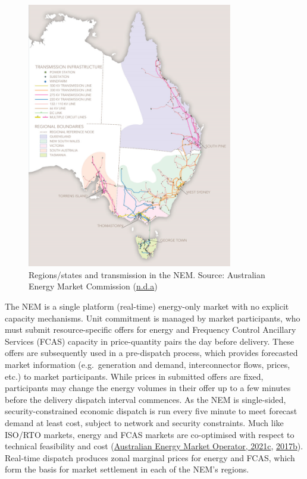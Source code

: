 \documentclass[12pt,a4paper,]{report}
\begin{document}
\begin{figure}
\hypertarget{fig:NEM}{%
\centering
\includegraphics[width=0.8\textwidth,height=\textheight]{source/figures/NEM.png}
\caption[The National Electricity Market (NEM)]{Regions/states and
transmission in the NEM. Source: Australian Energy Market Commission
(\protect\hyperlink{ref-australianenergymarketcommissionNationalElectricityMarket}{n.d.a})}\label{fig:NEM}
}
\end{figure}

The NEM is a single platform (real-time) energy-only market with no
explicit capacity mechanisms. Unit commitment is managed by market
participants, who must submit resource-specific offers for energy and
Frequency Control Ancillary Services (FCAS) capacity in price-quantity
pairs the day before delivery. These offers are subsequently used in a
pre-dispatch process, which provides forecasted market information
(e.g.~generation and demand, interconnector flows, prices, etc.) to
market participants. While prices in submitted offers are fixed,
participants may change the energy volumes in their offer up to a few
minutes before the delivery dispatch interval commences. As the NEM is
single-sided, security-constrained economic dispatch is run every five
minute to meet forecast demand at least cost, subject to network and
security constraints. Much like ISO/RTO markets, energy and FCAS markets
are co-optimised with respect to technical feasibility and cost
(\protect\hyperlink{ref-australianenergymarketoperatorDispatchStandardOperating2019}{Australian
Energy Market Operator, 2021c},
\protect\hyperlink{ref-australianenergymarketoperatorFCASModelNEMDE2017}{2017b}).
Real-time dispatch produces zonal marginal prices for energy and FCAS,
which form the basis for market settlement in each of the NEM's regions.
\end{document}
